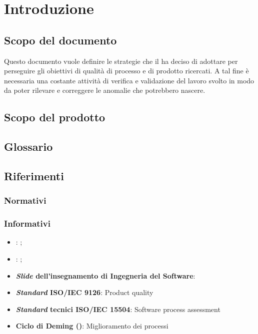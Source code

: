 \section{Introduzione}
\subsection{Scopo del documento}
Questo documento vuole definire le strategie che il  ha deciso di adottare per perseguire gli obiettivi di qualità di processo e di prodotto ricercati. A tal fine è necessaria una costante attività di verifica e validazione del lavoro svolto in modo da poter rilevare e correggere le anomalie che potrebbero nascere.

\subsection{Scopo del prodotto}
\scopoProdotto

\subsection{Glossario}
\descrizioneGlossario

\subsection{Riferimenti}
\subsubsection{Normativi}
\riferimentiNormativi

\subsubsection{Informativi}
\begin{itemize}
	\item \textbf{\AdR}: \analisiDeiRequisiti;
	\item \textbf{\PdP}: \pianoDiProgetto;
	\item \textbf{\textit{Slide} dell'insegnamento di Ingegneria del Software}: \\
	\item \textbf{\textit{Standard} ISO/IEC 9126}: Product quality \\
	\item \textbf{\textit{Standard} tecnici ISO/IEC 15504}: Software process assessment \\
	\item \textbf{Ciclo di Deming ()}: Miglioramento dei processi \\
\end{itemize}

\newpage